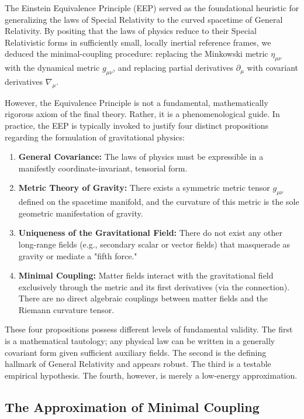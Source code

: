 \documentclass[11pt, a4paper]{report}
\begin{document}
The Einstein Equivalence Principle (EEP) served as the foundational heuristic for generalizing the laws of Special Relativity to the curved spacetime of General Relativity. By positing that the laws of physics reduce to their Special Relativistic forms in sufficiently small, locally inertial reference frames, we deduced the minimal-coupling procedure: replacing the Minkowski metric $\eta_{\mu\nu}$ with the dynamical metric $g_{\mu\nu}$, and replacing partial derivatives $\partial_{\mu}$ with covariant derivatives $\nabla_{\mu}$. 

However, the Equivalence Principle is not a fundamental, mathematically rigorous axiom of the final theory. Rather, it is a phenomenological guide. In practice, the EEP is typically invoked to justify four distinct propositions regarding the formulation of gravitational physics:

\begin{enumerate}
    \item \textbf{General Covariance:} The laws of physics must be expressible in a manifestly coordinate-invariant, tensorial form.
    \item \textbf{Metric Theory of Gravity:} There exists a symmetric metric tensor $g_{\mu\nu}$ defined on the spacetime manifold, and the curvature of this metric is the sole geometric manifestation of gravity.
    \item \textbf{Uniqueness of the Gravitational Field:} There do not exist any other long-range fields (e.g., secondary scalar or vector fields) that masquerade as gravity or mediate a "fifth force."
    \item \textbf{Minimal Coupling:} Matter fields interact with the gravitational field exclusively through the metric and its first derivatives (via the connection). There are no direct algebraic couplings between matter fields and the Riemann curvature tensor.
\end{enumerate}

These four propositions possess different levels of fundamental validity. The first is a mathematical tautology; any physical law can be written in a generally covariant form given sufficient auxiliary fields. The second is the defining hallmark of General Relativity and appears robust. The third is a testable empirical hypothesis. The fourth, however, is merely a low-energy approximation.

\subsection{The Approximation of Minimal Coupling}
\end{document}
